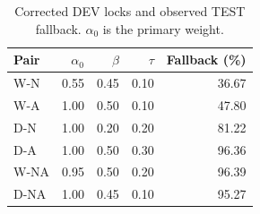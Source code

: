 \begin{table}[htbp]
\centering\small
\caption{Corrected DEV locks and observed TEST fallback. $\alpha_0$ is the primary weight.}
\label{tab:rerun-locks}
\begin{tabular}{lrrrr}
\toprule
Pair & $\alpha_0$ & $\beta$ & $\tau$ & Fallback (\%)\\
\midrule
W-N & 0.55 & 0.45 & 0.10 & 36.67\\
W-A & 1.00 & 0.50 & 0.10 & 47.80\\
D-N & 1.00 & 0.20 & 0.20 & 81.22\\
D-A & 1.00 & 0.50 & 0.30 & 96.36\\
W-NA & 0.95 & 0.50 & 0.20 & 96.39\\
D-NA & 1.00 & 0.45 & 0.10 & 95.27\\
\bottomrule
\end{tabular}
\end{table}
